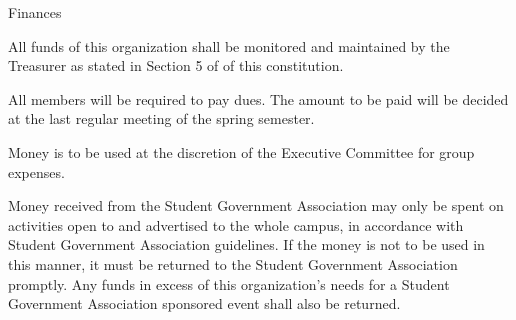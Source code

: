 {
\begin{article}{Finances}
	\item All funds of this organization shall be monitored and maintained by the Treasurer as stated in Section 5 of  of this constitution.
	\item All members will be required to pay dues.  The amount to be paid will be decided at the last regular meeting of the spring semester.
	\item Money is to be used at the discretion of the Executive Committee for group expenses.
	\item Money received from the Student Government Association may only be spent on activities open to and advertised to the whole campus, in accordance with Student Government Association guidelines.  If the money is not to be used in this manner, it must be returned to the Student Government Association promptly.  Any funds in excess of this organization's needs for a Student Government Association sponsored event shall also be returned.
\end{article}
}